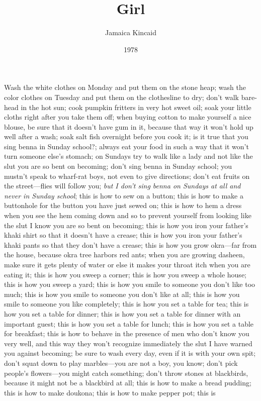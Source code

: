 \documentclass[10pt,a4paper]{article}
\begin{document}
\title{Girl}
\date{1978}
\author{Jamaica Kincaid}

\maketitle
    
\noindent\linenumbers Wash the white clothes on Monday and put them on the stone heap; wash the color clothes on Tuesday and put them on the clothesline to dry; don’t walk bare-head in the hot sun; cook pumpkin fritters in very hot sweet oil; soak your little cloths right after you take them off; when buying cotton to make yourself a nice blouse, be sure that it doesn’t have gum in it, because that way it won’t hold up well after a wash; soak salt fish overnight before you cook it; is it true that you sing benna in Sunday school?; always eat your food in such a way that it won’t turn someone else’s stomach; on Sundays try to walk like a lady and not like the slut you are so bent on becoming; don’t sing benna in Sunday school; you mustn’t speak to wharf-rat boys, not even to give directions; don’t eat fruits on the street—flies will follow you; \emph{but I don’t sing benna on Sundays at all and never in Sunday school}; this is how to sew on a button; this is how to make a buttonhole for the button you have just sewed on; this is how to hem a dress when you see the hem coming down and so to prevent yourself from looking like the slut I know you are so bent on becoming; this is how you iron your father’s khaki shirt so that it doesn’t have a crease; this is how you iron your father’s khaki pants so that they don’t have a crease; this is how you grow okra—far from the house, because okra tree harbors red ants; when you are growing dasheen, make sure it gets plenty of water or else it makes your throat itch when you are eating it; this is how you sweep a corner; this is how you sweep a whole house; this is how you sweep a yard; this is how you smile to someone you don’t like too much; this is how you smile to someone you don’t like at all; this is how you smile to someone you like completely; this is how you set a table for tea; this is how you set a table for dinner; this is how you set a table for dinner with an important guest; this is how you set a table for lunch; this is how you set a table for breakfast; this is how to behave in the presence of men who don’t know you very well, and this way they won’t recognize immediately the slut I have warned you against becoming; be sure to wash every day, even if it is with your own spit; don’t squat down to play marbles—you are not a boy, you know; don’t pick people’s flowers—you might catch something; don’t throw stones at blackbirds, because it might not be a blackbird at all; this is how to make a bread pudding; this is how to make doukona; this is how to make pepper pot; this is 
\end{document}

